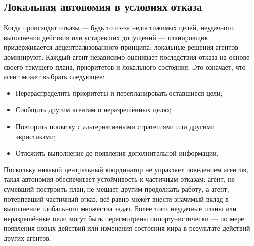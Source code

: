 \subsection{Локальная автономия в условиях отказа}

Когда происходят отказы --- будь то из-за недостижимых целей,
неудачного выполнения действия или устаревших допущений ---
планировщик придерживается децентрализованного принципа:
локальные решения агентов доминируют.
Каждый агент независимо оценивает последствия отказа
на основе своего текущего плана, приоритетов и локального состояния.
Это означает, что агент может выбрать следующее:
\begin{itemize}
  \item Перераспределить приоритеты и перепланировать оставшиеся цели;
  \item Сообщить другим агентам о неразрешённых целях;
  \item Повторить попытку с альтернативными стратегиями или другими эвристиками;
  \item Отложить выполнение до появления дополнительной информации.
\end{itemize}

Поскольку никакой центральный координатор не управляет поведением агентов,
такая автономия обеспечивает устойчивость к частичным отказам:
агент, не сумевший построить план, не мешает другим продолжать работу,
а агент, потерпевший частичный отказ, всё равно может внести значимый вклад
в выполнение глобального множества задач.
Более того, неудачные планы или неразрешённые цели
могут быть пересмотрены оппортунистически ---
по мере появления новых действий или изменения состояния мира
в результате действий других агентов.
